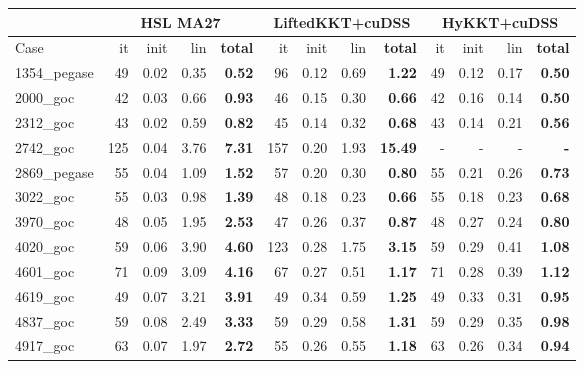 
    \begin{tabular}{|l|rrr >{\bfseries}r|rrr >{\bfseries}r|rrr >{\bfseries}r|}
      \hline
      & \multicolumn{4}{c|}{\bf HSL MA27} &
      \multicolumn{4}{c|}{\bf LiftedKKT+cuDSS} &
      \multicolumn{4}{c|}{\bf HyKKT+cuDSS} \\
      \hline
      Case & it & init & lin & total & it & init & lin & total & it & init & lin & total \\
      \hline
      \hline
      1354\_pegase & 49 & 0.02 & 0.35 & 0.52 & 96 & 0.12 & 0.69 & 1.22 & 49 & 0.12 & 0.17 & 0.50 \\
      2000\_goc & 42 & 0.03 & 0.66 & 0.93 & 46 & 0.15 & 0.30 & 0.66 & 42 & 0.16 & 0.14 & 0.50 \\
      2312\_goc & 43 & 0.02 & 0.59 & 0.82 & 45 & 0.14 & 0.32 & 0.68 & 43 & 0.14 & 0.21 & 0.56 \\
      2742\_goc & 125 & 0.04 & 3.76 & 7.31 & 157 & 0.20 & 1.93 & 15.49 & - & - & - & - \\
      2869\_pegase & 55 & 0.04 & 1.09 & 1.52 & 57 & 0.20 & 0.30 & 0.80 & 55 & 0.21 & 0.26 & 0.73 \\
      \hline
      3022\_goc & 55 & 0.03 & 0.98 & 1.39 & 48 & 0.18 & 0.23 & 0.66 & 55 & 0.18 & 0.23 & 0.68 \\
      3970\_goc & 48 & 0.05 & 1.95 & 2.53 & 47 & 0.26 & 0.37 & 0.87 & 48 & 0.27 & 0.24 & 0.80 \\
      4020\_goc & 59 & 0.06 & 3.90 & 4.60 & 123 & 0.28 & 1.75 & 3.15 & 59 & 0.29 & 0.41 & 1.08 \\
      4601\_goc & 71 & 0.09 & 3.09 & 4.16 & 67 & 0.27 & 0.51 & 1.17 & 71 & 0.28 & 0.39 & 1.12 \\
      4619\_goc & 49 & 0.07 & 3.21 & 3.91 & 49 & 0.34 & 0.59 & 1.25 & 49 & 0.33 & 0.31 & 0.95 \\
      \hline
      4837\_goc & 59 & 0.08 & 2.49 & 3.33 & 59 & 0.29 & 0.58 & 1.31 & 59 & 0.29 & 0.35 & 0.98 \\
      4917\_goc & 63 & 0.07 & 1.97 & 2.72 & 55 & 0.26 & 0.55 & 1.18 & 63 & 0.26 & 0.34 & 0.94 \\

\end{tabular}

